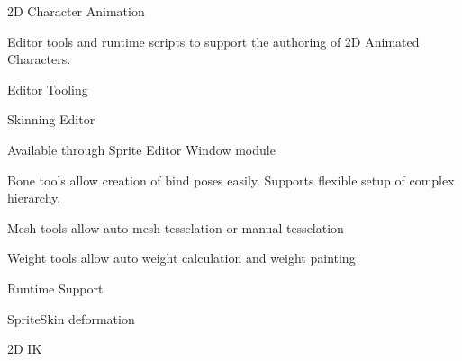 2D Character Animation

Editor tools and runtime scripts to support the authoring of 2D Animated Characters. ~\newline


Editor Tooling
\begin{DoxyItemize}
\item Skinning Editor
\begin{DoxyItemize}
\item Available through Sprite Editor Window module
\item Bone tools allow creation of bind poses easily. Supports flexible setup of complex hierarchy.
\item Mesh tools allow auto mesh tesselation or manual tesselation
\item Weight tools allow auto weight calculation and weight painting
\end{DoxyItemize}
\end{DoxyItemize}

Runtime Support
\begin{DoxyItemize}
\item Sprite\+Skin deformation
\item 2D IK 
\end{DoxyItemize}